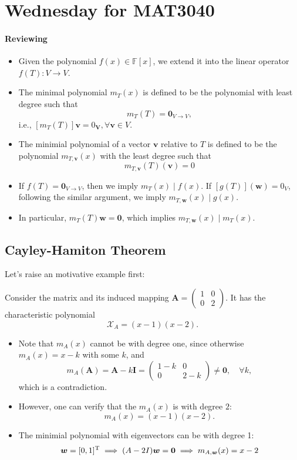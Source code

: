 
\section{Wednesday for MAT3040}
\paragraph{Reviewing}
\begin{itemize}
\item
Given the polynomial $f(x)\in\mathbb{F}[x]$, we extend it into the linear operator $f(T):V\to V$.
\item
The minimal polynomial $m_T(x)$ is defined to be the polynomial with least degree such that 
\[
m_T(T)=\bm0_{V\to V},
\]
i.e., $[m_T(T)]\bm v=0_{\bm V},\forall\bm v\in V$.
\item
The minimial polynomial of a vector $\bm v$ relative to $T$ is defined to be the polynomial $m_{T,\bm v}(x)$ with the least degree such that
\[
m_{T,\bm v}(T)(\bm v)=0
\]
\item
If $f(T) = \bm0_{V\to V}$, then we imply $m_T(x)\mid f(x)$.
If $[g(T)]({\bm w})=0_V$, following the similar argument, we imply $m_{T,\bm w}(x)\mid g(x)$.
\item
In particular, $m_T(T)\bm w=\bm0$, which implies $m_{T,\bm w}(x)\mid m_T(x)$.
\end{itemize}
\subsection{Cayley-Hamiton Theorem}
Let's raise an motivative example first:

\begin{example}
Consider the matrix and its induced mapping $\bm A=\begin{pmatrix}
1&0\\0&2
\end{pmatrix}$. It has the characteristic polynomial
\[
\mathcal{X}_{A}=(x-1)(x-2).
\]
\begin{itemize}
\item
Note that $m_A(x)$ cannot be with degree one, since otherwise $m_A(x)=x-k$ with some $k$, and
\[
m_A(\bm A) = \bm A-k\bm I=\begin{pmatrix}
1-k&0\\0&2-k
\end{pmatrix}\ne\bm0,\quad\forall k,
\]
which is a contradiction.
\item
However, one can verify that the $m_A(x)$ is with degree $2$:
\[
m_A(x) = (x-1)(x-2).
\]
\item
The minimial polynomial with eigenvectors can be with degree 1:
\[
\bm w=[0,1]^{\mathrm T}\implies
(A-2I)\bm w=\bm0\implies
m_{A,\bm w}(x) = x-2
\]
\end{itemize}
\end{example}

